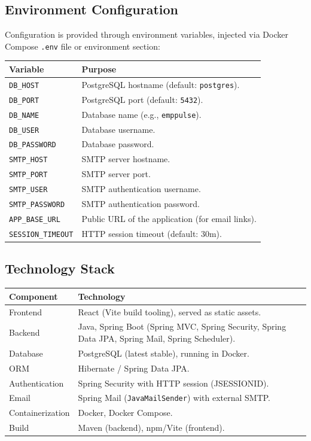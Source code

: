 \documentclass[11pt,a4paper]{article}
\begin{document}
\subsection{Environment Configuration}

Configuration is provided through environment variables, injected via Docker Compose \texttt{.env} file or environment section:

\begin{longtable}{p{5.5cm} p{8cm}}
\toprule
\textbf{Variable} & \textbf{Purpose} \\
\midrule
\texttt{DB\_HOST} & PostgreSQL hostname (default: \texttt{postgres}). \\
\texttt{DB\_PORT} & PostgreSQL port (default: \texttt{5432}). \\
\texttt{DB\_NAME} & Database name (e.g., \texttt{emppulse}). \\
\texttt{DB\_USER} & Database username. \\
\texttt{DB\_PASSWORD} & Database password. \\
\texttt{SMTP\_HOST} & SMTP server hostname. \\
\texttt{SMTP\_PORT} & SMTP server port. \\
\texttt{SMTP\_USER} & SMTP authentication username. \\
\texttt{SMTP\_PASSWORD} & SMTP authentication password. \\
\texttt{APP\_BASE\_URL} & Public URL of the application (for email links). \\
\texttt{SESSION\_TIMEOUT} & HTTP session timeout (default: 30m). \\
\bottomrule
\end{longtable}

\subsection{Technology Stack}

\begin{longtable}{p{3.5cm} p{10cm}}
\toprule
\textbf{Component} & \textbf{Technology} \\
\midrule
Frontend & React (Vite build tooling), served as static assets. \\
Backend & Java, Spring Boot (Spring MVC, Spring Security, Spring Data JPA, Spring Mail, Spring Scheduler). \\
Database & PostgreSQL (latest stable), running in Docker. \\
ORM & Hibernate / Spring Data JPA. \\
Authentication & Spring Security with HTTP session (JSESSIONID). \\
Email & Spring Mail (\texttt{JavaMailSender}) with external SMTP. \\
Containerization & Docker, Docker Compose. \\
Build & Maven (backend), npm/Vite (frontend). \\
\bottomrule
\end{longtable}
\end{document}
